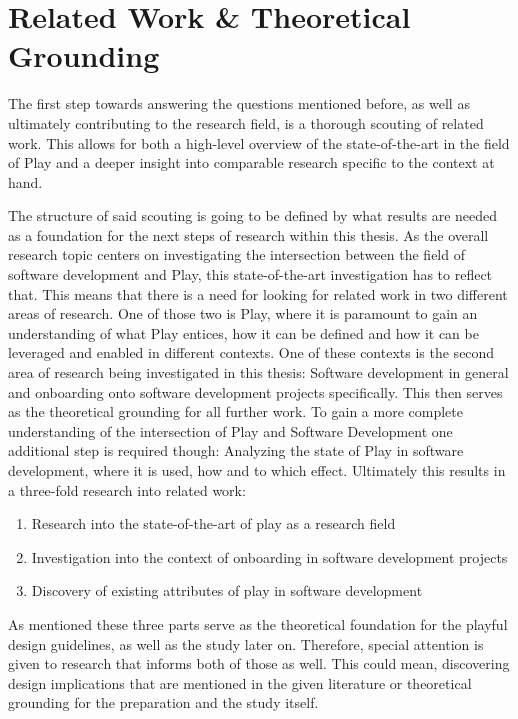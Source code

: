\section{Related Work \& Theoretical Grounding}

The first step towards answering the questions mentioned before, as well as ultimately contributing to the research field, is a thorough scouting of related work. This allows for both a high-level overview of the state-of-the-art in the field of Play and a deeper insight into comparable research specific to the context at hand.

The structure of said scouting is going to be defined by what results are needed as a foundation for the next steps of research within this thesis. As the overall research topic centers on investigating the intersection between the field of software development and Play, this state-of-the-art investigation has to reflect that. This means that there is a need for looking for related work in two different areas of research. One of those two is Play, where it is paramount to gain an understanding of what Play entices, how it can be defined and how it can be leveraged and enabled in different contexts. One of these contexts is the second area of research being investigated in this thesis: Software development in general and onboarding onto software development projects specifically. This then serves as the theoretical grounding for all further work. To gain a more complete understanding of the intersection of Play and Software Development one additional step is required though: Analyzing the state of Play in software development, where it is used, how and to which effect. Ultimately this results in a three-fold research into related work:

\begin{enumerate}
  \item{Research into the state-of-the-art of play as a research field}
  \item{Investigation into the context of onboarding in software development projects}
  \item{Discovery of existing attributes of play in software development}
\end{enumerate}

As mentioned these three parts serve as the theoretical foundation for the playful design guidelines, as well as the study later on. Therefore, special attention is given to research that informs both of those as well. This could mean, discovering design implications that are mentioned in the given literature or theoretical grounding for the preparation and the study itself.

